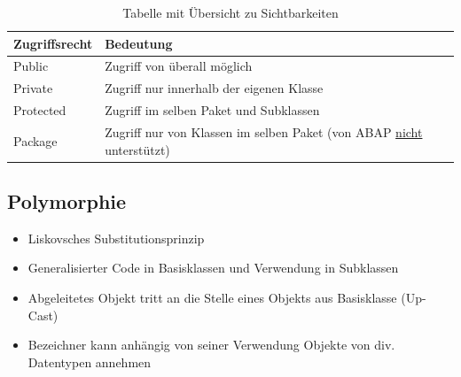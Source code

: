 \begin{table}[h!]
    \begin{tabular}{ l l }
        \hline
        \textbf{Zugriffsrecht} & \textbf{Bedeutung} \\ \hline
        Public & Zugriff von überall möglich \\ \hline
        Private & Zugriff nur innerhalb der eigenen Klasse \\ \hline 
        Protected & Zugriff im selben Paket und Subklassen \\ \hline
        Package & Zugriff nur von Klassen im selben Paket (von ABAP \underline{nicht} unterstützt) \\ 
        \hline
    \end{tabular}
    \caption{Tabelle mit Übersicht zu Sichtbarkeiten}
    \label{table:1}
\end{table}

\subsection{Polymorphie}
\begin{itemize}
    \item Liskovsches Substitutionsprinzip
    \item Generalisierter Code in Basisklassen und Verwendung in Subklassen
    \item Abgeleitetes Objekt tritt an die Stelle eines Objekts aus Basisklasse (Up-Cast)
    \item Bezeichner kann anhängig von seiner Verwendung Objekte von div. Datentypen annehmen
\end{itemize}
\newpage
